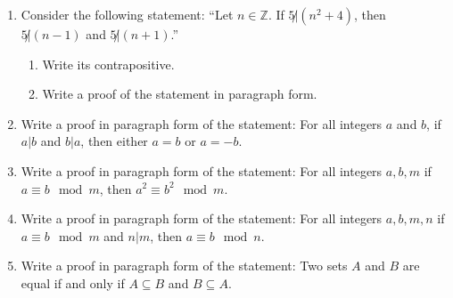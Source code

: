 \documentclass[12pt]{article}
\newcommand{\ZZ}{{\mathbb Z}}  %
\begin{document}
\begin{enumerate}
\newpage
 \item Consider the following statement:\newline
  ``Let $n\in\ZZ$.   If $5{\not|}(n^2+4)$, then $5{\not|}(n-1)$ and $5{\not|}(n+1)$.''
   \begin{enumerate}
     \item  Write its contrapositive.
    \item  Write a proof of the statement in paragraph form.  
  \end{enumerate}


 \item Write a proof in paragraph form of the statement: For all integers $a$ and $b$, if $a|b$ and $b|a$, then either
   $a=b$ or $a=-b$.


 \item Write a proof in paragraph form of the statement: For all integers $a,b,m$ if $a\equiv b\mod m$, then
   $a^2\equiv b^2\mod m$.

 \item Write a proof in paragraph form of the statement: For all integers $a,b,m,n$ if $a\equiv b\mod m$ and $n|m$, then
   $a\equiv b\mod n$.


 \item Write a proof in paragraph form of the statement: Two sets $A$ and $B$ are equal if and only if $A\subseteq B$ and
     $B\subseteq A$.


\end{enumerate}
\end{document}
